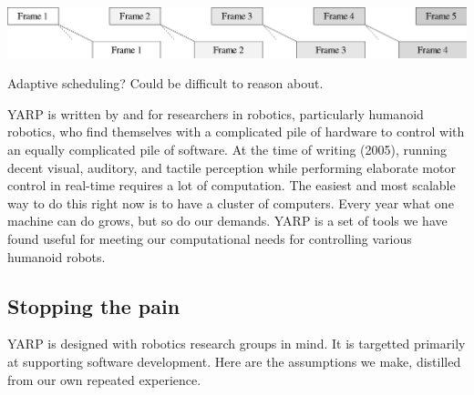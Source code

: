 \includegraphics[width=\columnwidth]{fig-throughput-postwait}

Adaptive scheduling?  Could be difficult to reason about.


YARP is written by and for researchers in robotics, particularly
humanoid robotics, who find themselves with a complicated pile of
hardware to control with an equally complicated pile of software. 
%
At the time of writing (2005), running decent visual, auditory, and
tactile perception while performing elaborate motor control in
real-time requires a lot of computation. The easiest and most scalable
way to do this right now is to have a cluster of computers. Every year
what one machine can do grows, but so do our demands. YARP is a set of
tools we have found useful for meeting our computational needs for
controlling various humanoid robots.

\subsection*{Stopping the pain}

YARP is designed with robotics research groups in mind.  
%
%
It is targetted primarily at supporting software development.
%
%
Here are the assumptions we make, distilled from our own repeated
experience.  
%

